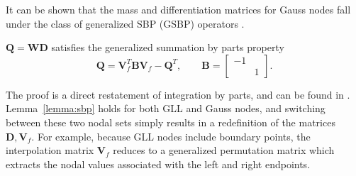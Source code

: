 \documentclass[review,onefignum,onetabnum,final]{siamart171218}
\newcommand{\pd}[2]{\frac{\partial#1}{\partial#2}}
\newcommand{\LRp}[1]{\left( #1 \right)}
\newcommand{\LRl}[1]{\left. #1 \right|}
\newcommand{\note}[1]{{\color{blue}{#1}}}
\begin{document}
It can be shown that the mass and differentiation matrices for Gauss nodes fall under the class of generalized SBP (GSBP) operators \cite{fernandez2014generalized}.  
\begin{lemma}
\label{lemma:sbp}
$\bm{Q} = \bm{W}\bm{D}$ satisfies the generalized summation by parts property
\[
\bm{Q} = \bm{V}_f^T \bm{B} \bm{V}_f - \bm{Q}^T, \qquad \bm{B} = \begin{bmatrix}-1 & \\ & 1\end{bmatrix}.
\]
\end{lemma}
The proof is a direct restatement of integration by parts, and can be found in \cite{fernandez2014generalized, ortleb2016kinetic, ortleb2017kinetic, ranocha2018generalised}.  
Lemma~\ref{lemma:sbp} holds for both GLL and Gauss nodes, and switching between these two nodal sets simply results in a redefinition of the matrices $\bm{D}, \bm{V}_f$.  For example, because GLL nodes include boundary points, the interpolation matrix $\bm{V}_f$ reduces to a generalized permutation matrix which extracts the nodal values associated with the left and right endpoints.  %
\end{document}
